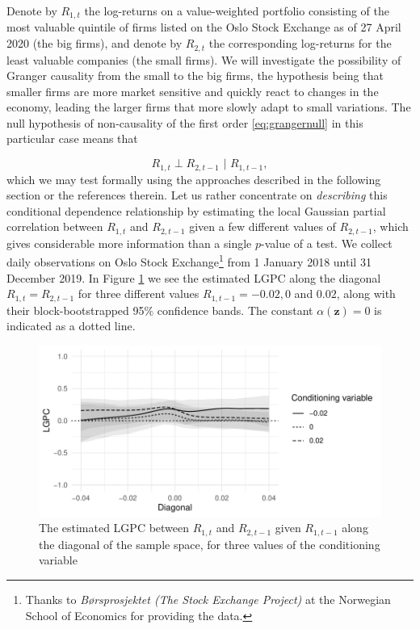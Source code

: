 \documentclass[
  12pt,
  letterpaper]{article}
\newcommand{\z}{\bm{z}}
\theoremstyle{definition}
\theoremstyle{definition}
\theoremstyle{definition}
\theoremstyle{remark}
\begin{document}
Denote by \(R_{1,t}\) the log-returns on a value-weighted portfolio consisting of the most valuable quintile of firms listed on the Oslo Stock Exchange as of 27 April 2020 (the big firms), and denote by \(R_{2,t}\) the corresponding log-returns for the least valuable companies (the small firms). We will investigate the possibility of Granger causality from the small to the big firms, the hypothesis being that smaller firms are more market sensitive and quickly react to changes in the economy, leading the larger firms that more slowly adapt to small variations. The null hypothesis of non-causality of the first order \eqref{eq:grangernull} in this particular case means that

\begin{equation}
R_{1,t} \perp R_{2, t-1} \,\,|\,\, R_{1,t-1},
\end{equation}
which we may test formally using the approaches described in the following section or the references therein. Let us rather concentrate on \emph{describing} this conditional dependence relationship by estimating the local Gaussian partial correlation between \(R_{1,t}\) and \(R_{2,t-1}\) given a few different values of \(R_{2,t-1}\), which gives considerable more information than a single \(p\)-value of a test. We collect daily observations on Oslo Stock Exchange\footnote{Thanks to \emph{Børsprosjektet (The Stock Exchange Project)} at the Norwegian School of Economics for providing the data.} from 1 January 2018 until 31 December 2019. In Figure \ref{fig:order1} we see the estimated LGPC along the diagonal \(R_{1,t} = R_{2,t-1}\) for three different values \(R_{1,t-1} = -0.02, 0\) and \(0.02\), along with their block-bootstrapped 95\% confidence bands. The constant \(\alpha(\z) = 0\) is indicated as a dotted line.

\begin{figure}[t]
\centering
\includegraphics{figures/granger-order1}
\caption{The estimated LGPC between $R_{1,t}$ and $R_{2,t-1}$ given $R_{1,t-1}$ along the diagonal of the sample space, for three values of the conditioning variable}
\label{fig:order1}
\end{figure}
\end{document}
